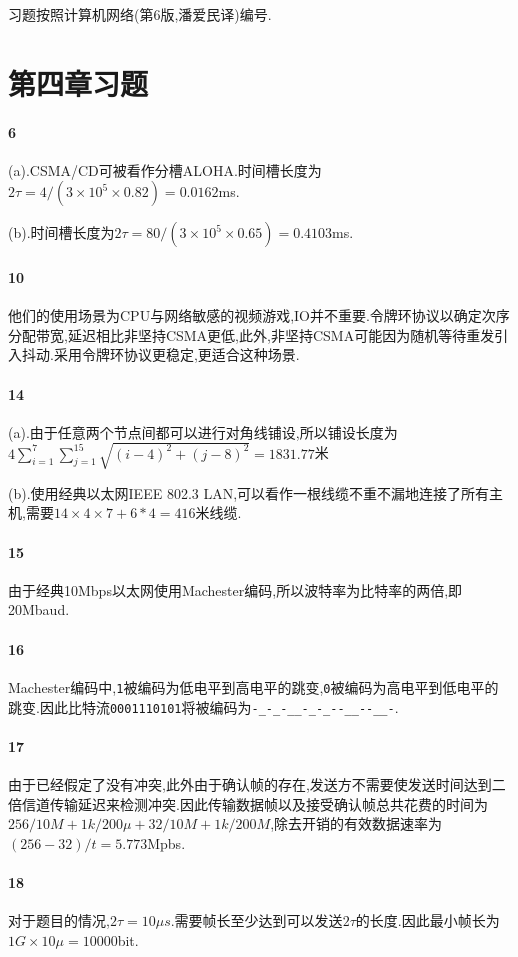 \documentclass[a4paper]{article}
\begin{document}
\courseheader
{}
习题按照计算机网络(第6版,潘爱民译)编号.
\section{第四章习题}
\paragraph{6} (a).CSMA/CD可被看作分槽ALOHA.时间槽长度为$2\tau=4/(3\times10^5\times0.82)=0.0162$ms.

(b).时间槽长度为$2\tau=80/(3\times10^5\times0.65)=0.4103$ms.
\paragraph{10}
他们的使用场景为CPU与网络敏感的视频游戏,IO并不重要.令牌环协议以确定次序分配带宽,延迟相比非坚持CSMA更低,此外,非坚持CSMA可能因为随机等待重发引入抖动.采用令牌环协议更稳定,更适合这种场景.
\paragraph{14}
(a).由于任意两个节点间都可以进行对角线铺设,所以铺设长度为$4\sum_{i=1}^7\sum_{j=1}^{15}\sqrt{(i-4)^2+(j-8)^2}=1831.77$米

(b).使用经典以太网IEEE 802.3 LAN,可以看作一根线缆不重不漏地连接了所有主机,需要$14\times4\times7+6*4=416$米线缆.
\paragraph{15}
由于经典10Mbps以太网使用Machester编码,所以波特率为比特率的两倍,即20Mbaud.
\paragraph{16}
Machester编码中,\verb|1|被编码为低电平到高电平的跳变,\verb|0|被编码为高电平到低电平的跳变.因此比特流\verb|0001110101|将被编码为\verb|-_-_-__-_-_--__--__-|.
\paragraph{17}
由于已经假定了没有冲突,此外由于确认帧的存在,发送方不需要使发送时间达到二倍信道传输延迟来检测冲突.因此传输数据帧以及接受确认帧总共花费的时间为$256/10M+1k/200\mu+32/10M+1k/200M$,除去开销的有效数据速率为$(256-32)/t=5.773$Mpbs.
\paragraph{18}
对于题目的情况,$2\tau=10\mu s$.需要帧长至少达到可以发送$2\tau$的长度.因此最小帧长为$1G\times10\mu=10000$bit.
\end{document}
